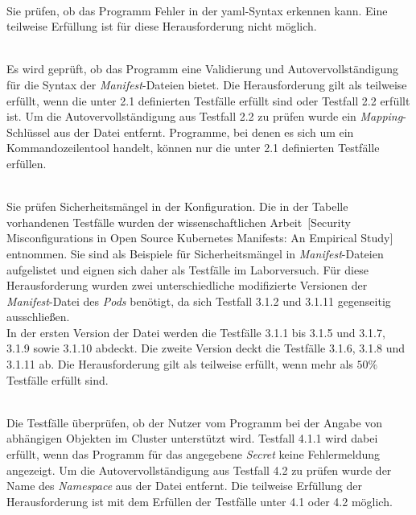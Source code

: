 \begin{description}
    \setlength\itemsep{-0.5cm}
    \item[Testfälle für Herausforderung 1]{~\\}
          Sie prüfen, ob das Programm Fehler in der \ac{yaml}-Syntax erkennen kann.
          Eine teilweise Erfüllung ist für diese Herausforderung nicht möglich.
    \item[Testfälle für Herausforderung 2]{~\\}
          Es wird geprüft, ob das Programm eine Validierung und Autovervollständigung für die Syntax der \textit{Manifest}-Dateien
          bietet. Die Herausforderung gilt als teilweise erfüllt, wenn die unter 2.1 definierten Testfälle erfüllt sind oder Testfall 2.2 erfüllt ist.
          Um die Autovervollständigung aus Testfall 2.2 zu prüfen wurde ein \textit{Mapping}-Schlüssel aus der Datei entfernt.
          Programme, bei denen es sich um ein Kommandozeilentool handelt, können nur die unter 2.1 definierten Testfälle erfüllen.
    \item[Testfälle für Herausforderung 3]{~\\}
          Sie prüfen Sicherheitsmängel in der Konfiguration. Die in der Tabelle vorhandenen Testfälle wurden
          der wissenschaftlichen Arbeit~\cite{10.1145/3579639}[Security Misconfigurations in Open Source Kubernetes Manifests: An Empirical Study]
          entnommen. Sie sind als Beispiele für Sicherheitsmängel in \textit{Manifest}-Dateien aufgelistet und eignen sich daher als Testfälle im Laborversuch.
          Für diese Herausforderung wurden zwei unterschiedliche modifizierte Versionen der \textit{Manifest}-Datei des \textit{Pods} benötigt,
          da sich Testfall 3.1.2 und 3.1.11 gegenseitig ausschließen.
          \\
          In der ersten Version der Datei werden die Testfälle 3.1.1 bis 3.1.5 und 3.1.7, 3.1.9 sowie 3.1.10 abdeckt.
          Die zweite Version deckt die Testfälle 3.1.6, 3.1.8 und 3.1.11 ab.
          Die Herausforderung gilt als teilweise erfüllt, wenn mehr als $50\%$ Testfälle erfüllt sind.

    \item[Testfälle für Herausforderung 4]{~\\}
          Die Testfälle überprüfen, ob der Nutzer vom Programm bei der Angabe von abhängigen Objekten im Cluster unterstützt wird.
          Testfall 4.1.1 wird dabei erfüllt, wenn das Programm für das angegebene \textit{Secret} keine Fehlermeldung angezeigt.
          Um die Autovervollständigung aus Testfall 4.2 zu prüfen wurde der Name des \textit{Namespace} aus der Datei entfernt.
          Die teilweise Erfüllung der Herausforderung ist mit dem Erfüllen der Testfälle unter 4.1 oder 4.2 möglich.
\end{description}

